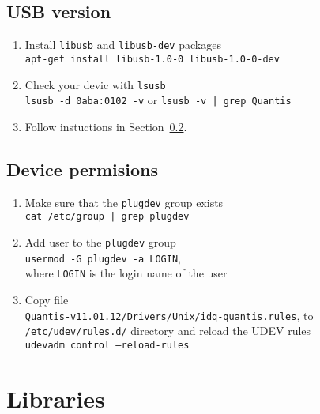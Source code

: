 \documentclass[a4paper]{scrartcl}
\begin{document}
\subsection{USB version}
\begin{enumerate}
    \item Install \texttt{libusb} and \texttt{libusb-dev} packages\\ 
    \texttt{apt-get install libusb-1.0-0 libusb-1.0-0-dev}
    \item Check your devic with \texttt{lsusb}\\
    \texttt{lsusb -d 0aba:0102 -v} or \texttt{lsusb -v | grep Quantis}
    \item Follow instuctions in Section~\ref{sec:permisions}.
\end{enumerate}


\subsection{Device permisions}\label{sec:permisions}
\begin{enumerate}
    \item Make sure that the \texttt{plugdev} group exists\\
    \texttt{cat /etc/group | grep plugdev}
    \item Add user to the \texttt{plugdev} group\\
    \texttt{usermod -G plugdev -a LOGIN},\\ where \texttt{LOGIN} is the login name of the user
    \item Copy file\\ \texttt{Quantis-v11.01.12/Drivers/Unix/idq-quantis.rules}, to \texttt{/etc/udev/rules.d/} directory and reload the UDEV rules\\
    \texttt{udevadm control --reload-rules}
\end{enumerate}

\section{Libraries}
\end{document}
